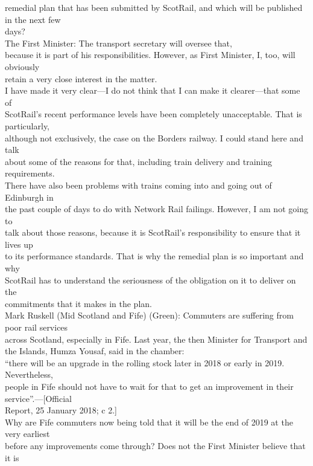 \documentclass{article}
\begin{document}
\begin{description}
{remedial plan that has been submitted by ScotRail, and which will be published in the next few\\
days?\\
The First Minister: The transport secretary will oversee that,\\
because it is part of his responsibilities. However, as First Minister, I, too, will obviously\\
retain a very close interest in the matter.\\
I have made it very clear—I do not think that I can make it clearer—that some of\\
ScotRail’s recent performance levels have been completely unacceptable. That is particularly,\\
although not exclusively, the case on the Borders railway. I could stand here and talk\\
about some of the reasons for that, including train delivery and training requirements.\\
There have also been problems with trains coming into and going out of Edinburgh in\\
the past couple of days to do with Network Rail failings. However, I am not going to\\
talk about those reasons, because it is ScotRail’s responsibility to ensure that it lives up\\
to its performance standards. That is why the remedial plan is so important and why\\
ScotRail has to understand the seriousness of the obligation on it to deliver on the\\
commitments that it makes in the plan.\\
Mark Ruskell (Mid Scotland and Fife) (Green): Commuters are suffering from poor rail services\\
across Scotland, especially in Fife. Last year, the then Minister for Transport and\\
the Islands, Humza Yousaf, said in the chamber:\\
“there will be an upgrade in the rolling stock later in 2018 or early in 2019. Nevertheless,\\
people in Fife should not have to wait for that to get an improvement in their service”.—[Official\\
Report, 25 January 2018; c 2.]\\
Why are Fife commuters now being told that it will be the end of 2019 at the very earliest\\
before any improvements come through? Does not the First Minister believe that it is\\
}
\end{description}
\end{document}
